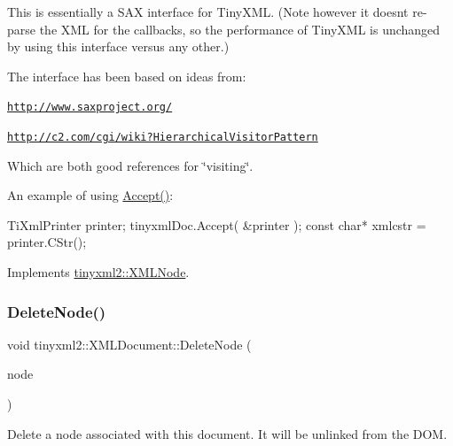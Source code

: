 This is essentially a S\+AX interface for Tiny\+X\+ML. (Note however it doesn\textquotesingle{}t re-\/parse the X\+ML for the callbacks, so the performance of Tiny\+X\+ML is unchanged by using this interface versus any other.)

The interface has been based on ideas from\+:


\begin{DoxyItemize}
\item \href{http://www.saxproject.org/}{\tt http\+://www.\+saxproject.\+org/}
\item \href{http://c2.com/cgi/wiki?HierarchicalVisitorPattern}{\tt http\+://c2.\+com/cgi/wiki?\+Hierarchical\+Visitor\+Pattern}
\end{DoxyItemize}

Which are both good references for \char`\"{}visiting\char`\"{}.

An example of using \hyperlink{classtinyxml2_1_1XMLDocument_ab7be651917a35ab1ff0e4e6d4e565cdf}{Accept()}\+: \begin{DoxyVerb}TiXmlPrinter printer;
tinyxmlDoc.Accept( &printer );
const char* xmlcstr = printer.CStr();
\end{DoxyVerb}
 

Implements \hyperlink{classtinyxml2_1_1XMLNode_a81e66df0a44c67a7af17f3b77a152785}{tinyxml2\+::\+X\+M\+L\+Node}.

\mbox{\label{classtinyxml2_1_1XMLDocument_ac1d6e2c7fcc1a660624ac4f68e96380d}} 
\subsubsection{\texorpdfstring{Delete\+Node()}{DeleteNode()}\hspace{0.1cm}{\footnotesize\ttfamily [1/2]}}
{\footnotesize\ttfamily void tinyxml2\+::\+X\+M\+L\+Document\+::\+Delete\+Node (\begin{DoxyParamCaption}\item[{\hyperlink{classtinyxml2_1_1XMLNode}{X\+M\+L\+Node} $\ast$}]{node }\end{DoxyParamCaption})\hspace{0.3cm}{\ttfamily [inline]}}

Delete a node associated with this document. It will be unlinked from the D\+OM. \mbox{\label{classtinyxml2_1_1XMLDocument_ac1d6e2c7fcc1a660624ac4f68e96380d}} 
